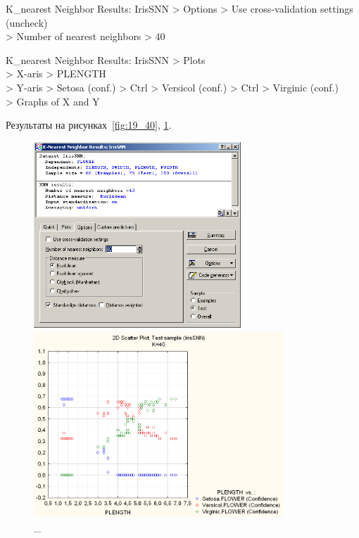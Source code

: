 K\_nearest Neighbor Results: IrisSNN > Options > Use cross-validation settings (uncheck) \\
> Number of nearest neighbors > 40

K\_nearest Neighbor Results: IrisSNN > Plots \\
> X-aris > PLENGTH \\
> Y-aris > Setosa (conf.) > Ctrl > Versicol (conf.) > Ctrl > Virginic (conf.) \\
> Graphs of X and Y

Результаты на рисунках~\ref{fig:19_40}, \ref{fig:20_40}.

\begin{figure}[!h]
  \centering

  \begin{minipage}{0.49\textwidth}
    \centering

    \includegraphics[height=7cm]
    {inc/ex_24.PNG}

    \caption{\_}

    \label{fig:19_40}
  \end{minipage}
  \begin{minipage}{0.49\textwidth}
    \centering

    \includegraphics[height=7cm]
    {inc/ex_25.PNG}

    \caption{\_}

    \label{fig:20_40}
  \end{minipage}
\end{figure}

